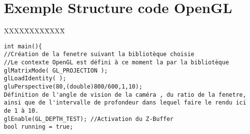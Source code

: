 \section{Exemple Structure code OpenGL}

\begin{tabbing}
XXXX\=XXXX\=XXXX\= \kill

\verb|int main(){|\\
\> \verb|//Création de la fenetre suivant la bibliotèque choisie|\\
\> \verb|//Le contexte OpenGL est défini à ce moment la par la bibliotèque|\\

\> \verb|glMatrixMode( GL_PROJECTION );|\\
\> \verb|glLoadIdentity( );|\\
\> \verb|gluPerspective(80,(double)800/600,1,10);|\\
\> \verb|Définition de l'angle de vision de la caméra , du ratio de la fenetre, ainsi que de l'intervalle de profondeur dans lequel faire le rendu ici de 1 à 10.|\\
\> \verb|glEnable(GL_DEPTH_TEST); //Activation du Z-Buffer|\\

\> \verb|bool running = true;|\\


\end{tabbing}
